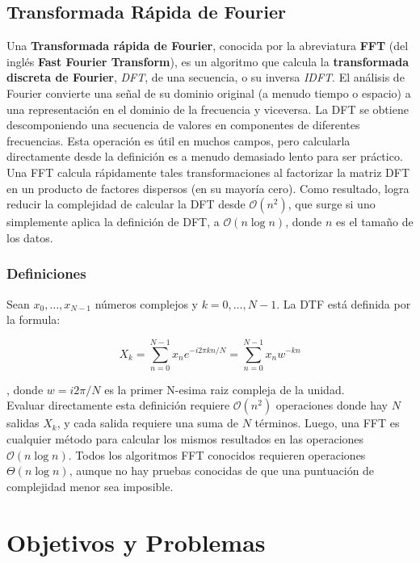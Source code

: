 \documentclass[osajnl,twocolumn,showpacs,superscriptaddress,10pt,floatfix]{revtex4-1} %
\begin{document}
\subsection{Transformada Rápida de Fourier}

Una \textbf{Transformada rápida de Fourier}, conocida por la abreviatura \textbf{FFT} (del inglés \textbf{Fast Fourier Transform}),
es un algoritmo que calcula la \textbf{transformada discreta de Fourier}, \textit{DFT}, de una secuencia, o su inversa \textit{IDFT}.
El análisis de Fourier convierte una señal de su dominio original (a menudo tiempo o espacio) a una representación
en el dominio de la frecuencia y viceversa. La DFT se obtiene descomponiendo una secuencia de valores en componentes
de diferentes frecuencias. Esta operación es útil en muchos campos, pero calcularla directamente desde la definición
es a menudo demasiado lento para ser práctico. Una FFT calcula rápidamente tales transformaciones al factorizar
la matriz DFT en un producto de factores dispersos (en su mayoría cero). Como resultado, logra reducir la complejidad
de calcular la DFT desde $\mathcal{O}(n^{2})$, que surge si uno simplemente aplica la definición de DFT,
a $\mathcal{O}(n \log{} n)$, donde $n$ es el tamaño de los datos.

\subsubsection{Definiciones}

Sean $x_{0}, \ldots, x_{N-1}$ números complejos y $k = 0, \ldots, N-1$. La DTF está definida por la formula:

\[
    X_{k} = \sum_{n = 0}^{N-1} x_{n} e^{-i2 \pi kn / N} = \sum_{n = 0}^{N-1} x_{n} w^{-kn}
\]

, donde $w = i2 \pi / N$ es la primer N-esima raiz compleja de la unidad. \\

Evaluar directamente esta definición requiere $\mathcal{O}(n^{2})$ operaciones donde hay $N$ salidas $X_{k}$, y cada
salida requiere una suma de $N$ términos. Luego, una FFT es cualquier método para calcular los mismos resultados
en las operaciones $\mathcal{O}(n \log{} n)$. Todos los algoritmos FFT conocidos requieren operaciones $\mathcal{\Theta}(n \log{} n)$,
aunque no hay pruebas conocidas de que una puntuación de complejidad menor sea imposible.

\section{Objetivos y Problemas}
\end{document}
